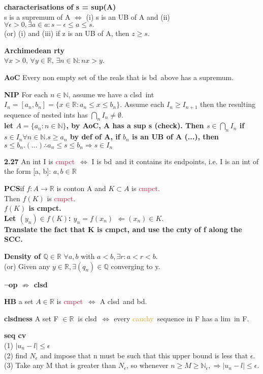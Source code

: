 \documentclass[10pt,landscape,a4paper]{article}
\def\line{

  \noindent{\color{mygray} \rule{\linewidth}{0.005mm}}

}
\def\R{\mathbb{R}}
\def\N{\mathbb{N}}
\def\Q{\mathbb{Q}}
\def \bd{\textcolor{burgundy}{bd}}
\def\clsd{\textcolor{cyan(process)}{clsd}}
\def\cmpct{\textcolor{crimson}{cmpct}}
\def\cv{\textcolor{emerald}{cv}}
\def\cauchy{\textcolor{goldenrod}{cauchy}}
\def\lim{\textcolor{frenchrose}{lim}}
\def\cont{\textcolor{brickred}{cont}}
\newcommand\thm[1]{\line\textcolor{darklavender}{\bf#1}}
\newcommand\hint[1]{\textcolor{trolleygrey}{\bf#1}}
\newcommand\greenbox[1]{\line\textcolor{ferngreen}{\bf#1}}
\begin{document}
\begin{multicols}{8}
\greenbox{characterisations of s = sup(A)}\\
s is a supremum of A $\Leftrightarrow$ (i) s is an UB of A and (ii) $\forall \epsilon > 0, \exists a \in a : s - \epsilon \leq a \leq s.$\\
(or) (i) and (iii) if z is an UB of A, then $z \geq s.$

\thm{Archimedean rty} \\$\forall x > 0$, $\forall y \in \R$, $\exists n \in \N: nx > y.$

\thm{AoC}
Every non empty set of the reals that is  \bd\ above has a supremum.

\thm{NIP}
For each $n \in \N$, assume we have a \clsd\ int ${I_n = [a_n, b_n]} = \{x \in \R: {a_n \leq x \leq b_n\}}$. Assume each $I_n \geq I_{n+1}$ then the resulting sequence of nested ints has $\bigcap_n I_n \neq \emptyset.$
\\\hint{let $A = \{a_n: n \in \N\}$, by AoC, A has a sup s (check). Then $s \in \bigcap_n I_n$ if $s \in I_n \forall n \in \N. s\geq a_n$ by def of A, if $b_n$ is an UB of A (...), then $s\leq b_n. (\hdots) \therefore a_n \leq s \leq b_n \Rightarrow s \in I_n$}

\thm{2.27} An int I is \cmpct\ $\Leftrightarrow$ I is  \bd\ and it contains its endpoints, i.e. I is an int of the form [a, b]: $ a, b \in \R $

\thm{PCS}if $ f: A \to \R$ is \cont on A and $K \subset A$ is \cmpct.\\ Then $f(K)$ is \cmpct.\\ 
\hint{$f(K)$ is cmpct. \\Let $(y_n) \in f(K)$: $y_n = f(x_n)$ $\Leftarrow (x_n)\in K.$\\ Translate the fact that K is cmpct, and use the cnty of f along the SCC.}

\thm{Density of $ \Q \in \R $} $\forall a, b$ with $a < b, \exists r: a < r < b.$ \\ (or) Given any $y \in \R, \exists (q_n) \in \Q$ converging to y.

\hint{$\neg $op $ \nRightarrow$ \clsd} 

\thm{HB} a set $A \in \R$ is \cmpct\ $\Leftrightarrow$ A \clsd\ and  \bd.


\thm{clsdness}  A set F $\in \R\ $ is \clsd\ $\Leftrightarrow$ every \cauchy\ sequence in F has a \lim\ in F.
\tiny
\greenbox{seq \cv} \\ (1) $|u_n - l| \leq \epsilon$ \\(2) find $N_\epsilon$ and impose that n must be such that this upper bound is less that $ \epsilon$.\\
(3) Take any M that is greater than $N_\epsilon$, so whenever $n \geq M \geq \N_\epsilon, \Rightarrow |u_n - l| \leq \epsilon$.


\end{multicols}
\end{document}
